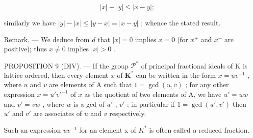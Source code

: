 \[
\left| x \right| - \left| y \right| \leqslant \left| x - y \right|;
\]

similarly we have \(|y| - |x| \leqslant |y - x| = |x - y|\) ; whence the stated result.

Remark. --- We deduce from \(d\) that \(|x|=0\) implies \(x=0\) (for \(x^{+}\) and \(x^{-}\) are positive); thus \(x\neq0\) implies \(|x|>0\) .

PROPOSITION 9 (DIV). --- If the group \(\mathcal{P}^*\) of principal fractional ideals of K is lattice ordered, then every element \(x\) of \(\mathbf{K}^*\) can be written in the form \(x = uv^{-1}\) , where \(u\) and \(v\) are elements of A such that \(1 = \gcd(u, v)\) ; for any other expression \(x = u'v'^{-1}\) of \(x\) as the quotient of two elements of A, we have \(u' = uw\) and \(v' = vw\) , where \(w\) is a gcd of \(u'\) , \(v'\) ; in particular if \(1 = \gcd(u', v')\) then \(u'\) and \(v'\) are associates of \(u\) and \(v\) respectively.

Such an expression \(uv^{-1}\) for an element x of \(K^{*}\) is often called a reduced fraction.

